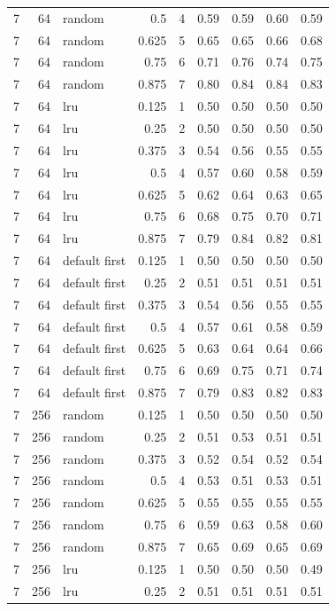 \begin{longtable}{@{}rrlrrrrrr@{}}
7 & 64 & random & 0.5 & 4 & 0.59 & 0.59 & 0.60 & 0.59 \\
7 & 64 & random & 0.625 & 5 & 0.65 & 0.65 & 0.66 & 0.68 \\
7 & 64 & random & 0.75 & 6 & 0.71 & 0.76 & 0.74 & 0.75 \\
7 & 64 & random & 0.875 & 7 & 0.80 & 0.84 & 0.84 & 0.83 \\
7 & 64 & lru & 0.125 & 1 & 0.50 & 0.50 & 0.50 & 0.50 \\
7 & 64 & lru & 0.25 & 2 & 0.50 & 0.50 & 0.50 & 0.50 \\
7 & 64 & lru & 0.375 & 3 & 0.54 & 0.56 & 0.55 & 0.55 \\
7 & 64 & lru & 0.5 & 4 & 0.57 & 0.60 & 0.58 & 0.59 \\
7 & 64 & lru & 0.625 & 5 & 0.62 & 0.64 & 0.63 & 0.65 \\
7 & 64 & lru & 0.75 & 6 & 0.68 & 0.75 & 0.70 & 0.71 \\
7 & 64 & lru & 0.875 & 7 & 0.79 & 0.84 & 0.82 & 0.81 \\
7 & 64 & default first & 0.125 & 1 & 0.50 & 0.50 & 0.50 & 0.50 \\
7 & 64 & default first & 0.25 & 2 & 0.51 & 0.51 & 0.51 & 0.51 \\
7 & 64 & default first & 0.375 & 3 & 0.54 & 0.56 & 0.55 & 0.55 \\
7 & 64 & default first & 0.5 & 4 & 0.57 & 0.61 & 0.58 & 0.59 \\
7 & 64 & default first & 0.625 & 5 & 0.63 & 0.64 & 0.64 & 0.66 \\
7 & 64 & default first & 0.75 & 6 & 0.69 & 0.75 & 0.71 & 0.74 \\
7 & 64 & default first & 0.875 & 7 & 0.79 & 0.83 & 0.82 & 0.83 \\
7 & 256 & random & 0.125 & 1 & 0.50 & 0.50 & 0.50 & 0.50 \\
7 & 256 & random & 0.25 & 2 & 0.51 & 0.53 & 0.51 & 0.51 \\
7 & 256 & random & 0.375 & 3 & 0.52 & 0.54 & 0.52 & 0.54 \\
7 & 256 & random & 0.5 & 4 & 0.53 & 0.51 & 0.53 & 0.51 \\
7 & 256 & random & 0.625 & 5 & 0.55 & 0.55 & 0.55 & 0.55 \\
7 & 256 & random & 0.75 & 6 & 0.59 & 0.63 & 0.58 & 0.60 \\
7 & 256 & random & 0.875 & 7 & 0.65 & 0.69 & 0.65 & 0.69 \\
7 & 256 & lru & 0.125 & 1 & 0.50 & 0.50 & 0.50 & 0.49 \\
7 & 256 & lru & 0.25 & 2 & 0.51 & 0.51 & 0.51 & 0.51 \\

\end{longtable}
